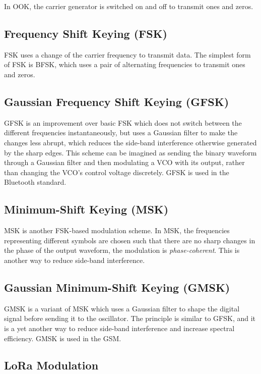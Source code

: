 In \gls{OOK}, the carrier generator is switched on and off to transmit ones and zeros.

\subsection{Frequency Shift Keying (FSK)}

\Gls{FSK} uses a change of the carrier frequency to transmit data. The simplest form of \gls{FSK} is \gls{BFSK}, which uses a pair of alternating frequencies to transmit ones and zeros.

\subsection{Gaussian Frequency Shift Keying (GFSK)}

\Gls{GFSK} is an improvement over basic \gls{FSK} which does not switch between the different frequencies instantaneously, but uses a Gaussian filter to make the changes less abrupt, which reduces the side-band interference otherwise generated by the sharp edges. This scheme can be imagined as sending the binary waveform through a Gaussian filter and then modulating a \gls{VCO} with its output, rather than changing the \gls{VCO}'s control voltage discretely. \Gls{GFSK} is used in the Bluetooth standard.

\subsection{Minimum-Shift Keying (MSK)}

\Gls{MSK} is another \gls{FSK}-based modulation scheme. In \gls{MSK}, the frequencies representing different symbols are chosen such that there are no sharp changes in the phase of the output waveform, the modulation is \textit{phase-coherent}. This is another way to reduce side-band interference.

\subsection{Gaussian Minimum-Shift Keying (GMSK)}

\Gls{GMSK} is a variant of \gls{MSK} which uses a Gaussian filter to shape the digital signal before sending it to the oscillator. The principle is similar to \gls{GFSK}, and it is a yet another way to reduce side-band interference and increase spectral efficiency. \gls{GMSK} is used in the \gls{GSM}.

\subsection{LoRa Modulation}

